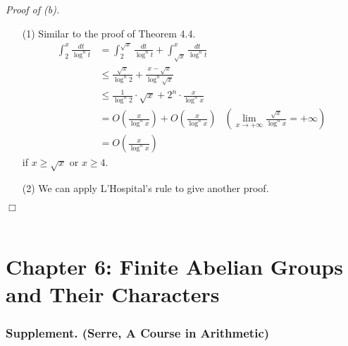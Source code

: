 \documentclass{article}
\begin{document}
\emph{Proof of (b).}
\begin{enumerate}
\item[(1)]
  Similar to the proof of Theorem 4.4.
  \begin{align*}
    \int_{2}^{x} \frac{dt}{\log^n t}
    &= \int_{2}^{\sqrt{x}} \frac{dt}{\log^n t} + \int_{\sqrt{x}}^{x} \frac{dt}{\log^n t} \\
    &\leq \frac{\sqrt{x}}{\log^n 2} + \frac{x - \sqrt{x}}{\log^n \sqrt{x}} \\
    &\leq \frac{1}{\log^n 2} \cdot \sqrt{x} + 2^n \cdot \frac{x}{\log^n x} \\
    &= O\left( \frac{x}{\log^{n} x} \right) + O\left( \frac{x}{\log^{n} x} \right)
      &\left(\text{$\lim_{x \to +\infty} \frac{\sqrt{x}}{\log^{n} x} = +\infty$}\right) \\
    &= O\left( \frac{x}{\log^{n} x} \right)
  \end{align*}
  if $x \geq \sqrt{x}$ or $x \geq 4$.

\item[(2)]
  We can apply L'Hospital's rule to give another proof.
\end{enumerate}
$\Box$ \\\\






\newpage
\section*{Chapter 6: Finite Abelian Groups and Their Characters \\}






\subsubsection*{Supplement. (Serre, A Course in Arithmetic)}
\end{document}

